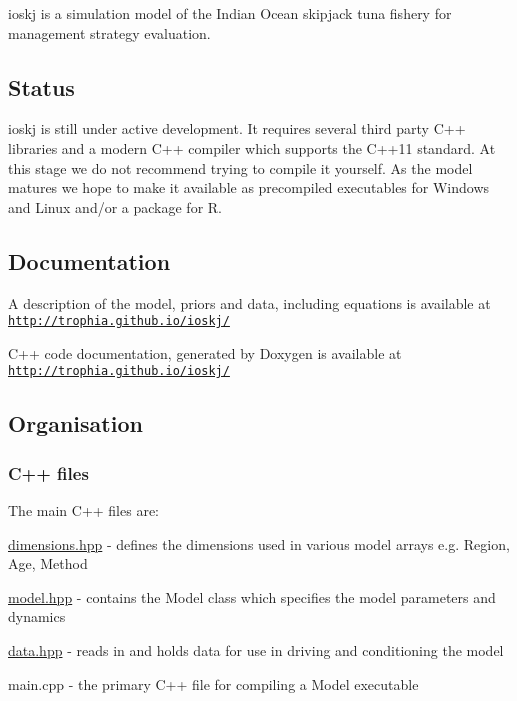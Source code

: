 {\ttfamily ioskj} is a simulation model of the Indian Ocean skipjack tuna fishery for management strategy evaluation.

\subsection*{Status}

{\ttfamily ioskj} is still under active development. It requires several third party C++ libraries and a modern C++ compiler which supports the C++11 standard. At this stage we do not recommend trying to compile it yourself. As the model matures we hope to make it available as precompiled executables for Windows and Linux and/or a package for R.

\subsection*{Documentation}

A description of the model, priors and data, including equations is available at \href{http://trophia.github.io/ioskj/}{\tt http\-://trophia.\-github.\-io/ioskj/}

C++ code documentation, generated by Doxygen is available at \href{http://trophia.github.io/ioskj/}{\tt http\-://trophia.\-github.\-io/ioskj/}

\subsection*{Organisation}

\subsubsection*{C++ files}

The main C++ files are\-:


\begin{DoxyItemize}
\item {\ttfamily \hyperlink{dimensions_8hpp_source}{dimensions.\-hpp}} -\/ defines the dimensions used in various model arrays e.\-g. {\ttfamily Region}, {\ttfamily Age}, {\ttfamily Method}
\item {\ttfamily \hyperlink{model_8hpp_source}{model.\-hpp}} -\/ contains the {\ttfamily Model} class which specifies the model parameters and dynamics
\item {\ttfamily \hyperlink{data_8hpp_source}{data.\-hpp}} -\/ reads in and holds data for use in driving and conditioning the model
\item {\ttfamily main.\-cpp} -\/ the primary C++ file for compiling a {\ttfamily Model} executable
\end{DoxyItemize}

